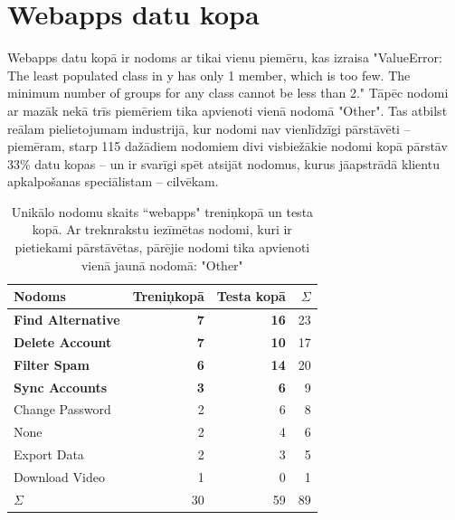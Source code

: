 \section{Webapps datu kopa}


Webapps datu kopā ir nodoms ar tikai vienu piemēru, kas izraisa "ValueError: The least populated class in y has only 1 member, which is too few. The minimum number of groups for any class cannot be less than 2." Tāpēc nodomi ar mazāk nekā trīs piemēriem tika apvienoti vienā nodomā "Other". Tas atbilst reālam pielietojumam industrijā, kur nodomi nav vienlīdzīgi pārstāvēti  -- piemēram, starp 115 dažādiem nodomiem divi visbiežākie nodomi kopā pārstāv 33\% datu kopas \cite{paikens2020} -- un ir svarīgi spēt atsijāt nodomus, kurus jāapstrādā klientu apkalpošanas speciālistam -- cilvēkam.



\begin{table}[htbp]
  \centering
  \caption{Unikālo nodomu skaits ``webapps" treniņkopā un testa kopā. Ar treknrakstu iezīmētas nodomi, kuri ir pietiekami pārstāvētas, pārējie nodomi tika apvienoti vienā jaunā nodomā: "Other"}
    \begin{tabular}{lrrr} \toprule
    Nodoms & Treniņkopā & Testa kopā & $\Sigma$ \\\midrule
    \textbf{Find Alternative} & \textbf{7} & \textbf{16} & 23\\
    \textbf{Delete Account} & \textbf{7} & \textbf{10} & 17\\
    \textbf{Filter Spam} & \textbf{6} & \textbf{14} & 20 \\
    \textbf{Sync Accounts} & \textbf{3} & \textbf{6} & 9 \\
    Change Password & 2     & 6 & 8\\
    None  & 2     & 4 & 6\\
    Export Data & 2     & 3 & 5 \\
    Download Video & 1     & 0 & 1\\
    $\Sigma$ & 30    & 59 & 89 \\\bottomrule
    \end{tabular}%
  \label{tab:webapps-labels}%
\end{table}%


